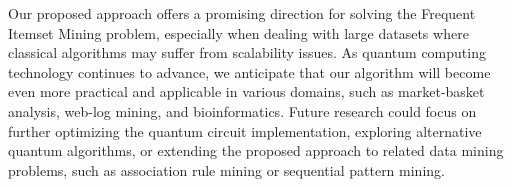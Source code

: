Our proposed approach offers a promising direction for solving the Frequent Itemset Mining problem, especially when dealing with large datasets where classical algorithms may suffer from scalability issues. As quantum computing technology continues to advance, we anticipate that our algorithm will become even more practical and applicable in various domains, such as market-basket analysis, web-log mining, and bioinformatics. Future research could focus on further optimizing the quantum circuit implementation, exploring alternative quantum algorithms, or extending the proposed approach to related data mining problems, such as association rule mining or sequential pattern mining.

